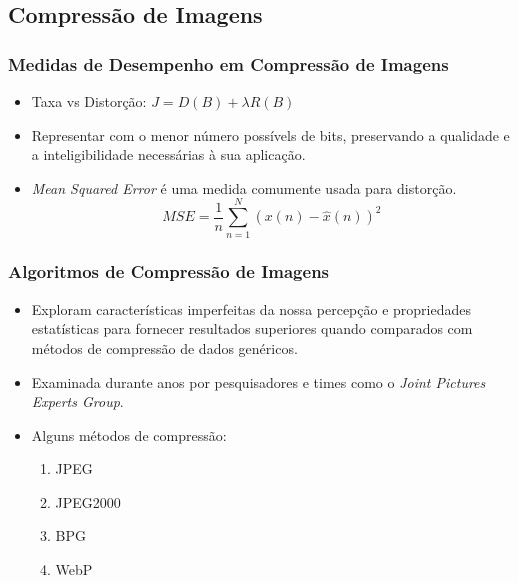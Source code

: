 \documentclass{beamer}
\begin{document}
\subsection{Compressão de Imagens}
\begin{frame}
\frametitle{Medidas de Desempenho em Compressão de Imagens}
\begin{itemize}
    \item Taxa vs Distorção: $J = D(B) + \lambda R(B)$
    \item Representar com o menor número possívels de bits, preservando a qualidade e a inteligibilidade necessárias à sua aplicação.
    \item \textit{Mean Squared Error} é uma medida comumente usada para distorção.
    \begin{equation} MSE = \dfrac{1}{n}\sum_{n=1}^{N}{(x(n) - \hat{x}(n))}^2 \end{equation}
\end{itemize}
\end{frame}
\begin{frame}
\frametitle{Algoritmos de Compressão de Imagens}
\begin{itemize}
    \item Exploram características imperfeitas da nossa percepção e propriedades estatísticas para fornecer resultados superiores quando comparados com métodos de compressão de dados genéricos.
    \item Examinada durante anos por pesquisadores e times como o \textit{Joint Pictures Experts Group}.
    \item Alguns métodos de compressão:
    \begin{enumerate}
    \item JPEG~\cite{jpeg}
    \item JPEG2000~\cite{jpeg2000}
    \item BPG~\cite{bpg}
    \item WebP~\cite{webp}
    \end{enumerate}
\end{itemize}
\end{frame}
\end{document}
